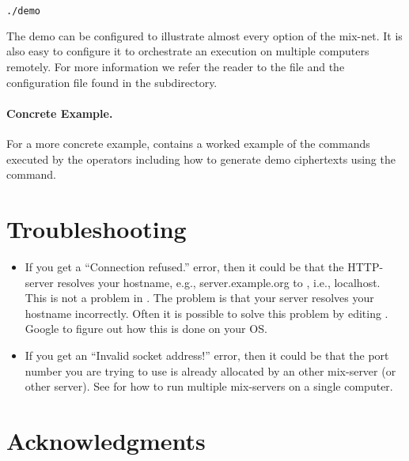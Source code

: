 \documentclass[11pt]{article}
\begin{document}
\vspace{0.3cm}
\begin{lstlisting}[frame=single,language=xml,
basicstyle=\tt,showstringspaces=false]
./demo
\end{lstlisting}

\vspace{0.2cm}
\noindent
The demo can be configured to illustrate almost every option of the
mix-net. It is also easy to configure it to orchestrate an execution
on multiple computers remotely. For more information we refer the
reader to the  file and the configuration file
 found in the  subdirectory.

\paragraph{Concrete Example.}

For a more concrete example,  contains a worked example
of the commands executed by the operators including how to generate
demo ciphertexts using the \vmnd{} command.

\section{Troubleshooting}

\begin{itemize}

\item If you get a ``Connection refused.'' error, then it could be
  that the HTTP-server resolves your hostname, e.g.,
  server.example.org to , i.e., localhost. This is not
  a problem in \veri. The problem is that your server resolves your
  hostname incorrectly. Often it is possible to solve this problem by
  editing . Google to figure out how this is done on
  your OS.

\item If you get an ``Invalid socket address!'' error, then it could
  be that the port number you are trying to use is already allocated
  by an other mix-server (or other server). See  for
  how to run multiple mix-servers on a single computer.

\end{itemize}


\section{Acknowledgments}
\end{document}
